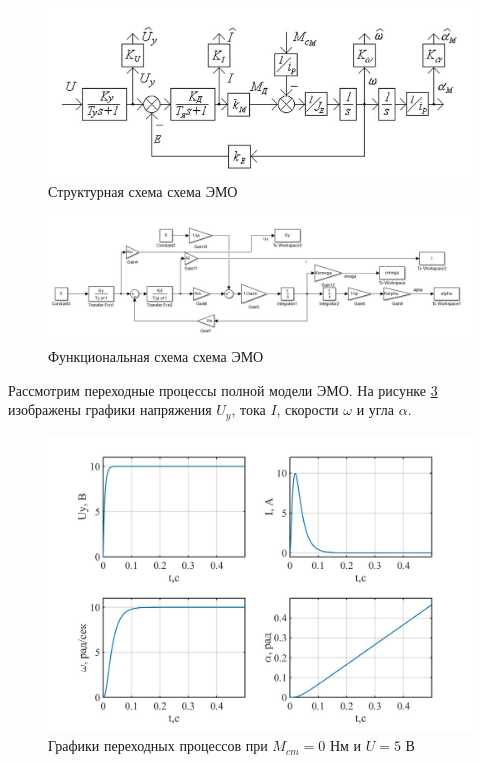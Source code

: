 \documentclass[a4paper, 12pt]{article}
\begin{document}
\begin{figure}[h!]
	\centering
	\includegraphics[width = 1\textwidth]{strEMO}
	\caption{Структурная схема схема ЭМО}
	\label{strEMO}
\end{figure}
\begin{figure}[h!]
	\centering
	\includegraphics[width = 1\textwidth]{fullmod}
	\caption{Функциональная схема схема ЭМО}
	\label{funcEMO}
\end{figure}

Рассмотрим переходные процессы полной модели ЭМО.
На рисунке \ref{begin} изображены графики напряжения $U_y$, тока $I$, скорости $\omega$ и угла $\alpha$.

\newpage
\begin{figure}[h!]
	\centering
	\includegraphics[width = 1\textwidth]{data/begin}
	\caption{Графики переходных процессов при $M_{cm}=0$ Нм и $U=5$ В}
	\label{begin}
\end{figure}  
\end{document}

